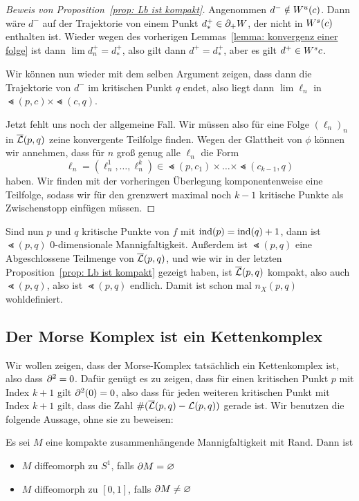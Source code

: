 \begin{proof}[Beweis von Proposition~\ref{prop: Lb ist kompakt}]
    Angenommen $d^- \notin { W^u } (c)$. Dann wäre $d^-$ auf der Trajektorie von einem Punkt
    $d^+_{\ast} \in { \partial }_+ W$, der nicht in ${ W^s } (c)$ enthalten ist. Wieder wegen des vorherigen
    Lemmas~\ref{lemma: konvergenz einer folge} ist dann $\lim d_n^+ = d^+_{\ast}$, also gilt dann
    $d^+ = d^+_{\ast}$, aber es gilt $d^+ \in { W^s }{c}$.
    
    Wir können nun wieder mit dem selben Argument zeigen, dass dann die Trajektorie von $d^-$ im
    kritischen Punkt $q$ endet, also liegt dann $\lim \ell_n$ in $\Lt (p, c) \times \Lt (c, q)$.

    Jetzt fehlt uns noch der allgemeine Fall. Wir müssen also für eine Folge $(\ell_n)_n$ in 
    ${\overline{\mathcal{L}} } (p, q)$ zeine konvergente Teilfolge finden. Wegen der Glattheit von $\phi$ können wir annehmen,
    dass für $n$ groß genug alle $\ell_n$ die Form 
    \[ \ell_n = (\ell^1_n, \dots, \ell^k_n) \in \Lt (p, c_1) \times \dots \times \Lt (c_{k - 1}, q) \]
    haben. Wir finden mit der vorheringen Überlegung komponentenweise eine Teilfolge, sodass wir 
    für den grenzwert maximal noch $k - 1$ kritische Punkte als \glqq Zwischenstopp\grqq{} einfügen
    müssen. 
\end{proof}

\begin{remark}
    Sind nun $p$ und $q$ kritische Punkte von $f$ mit ${ \operatorname{ind} } (p) = { \operatorname{ind} } (q) + 1$, dann ist 
    $\Lt(p, q)$ $0$-dimensionale Mannigfaltigkeit. Außerdem ist $\Lt (p, q)$ eine Abgeschlossene
    Teilmenge von ${\overline{\mathcal{L}} } (p, q)$, und wie wir in der letzten Proposition~\ref{prop: Lb ist kompakt}
    gezeigt haben, ist ${\overline{\mathcal{L}} }(p, q)$ kompakt, also auch $\Lt(p, q)$, also ist $\Lt (p, q)$ endlich.
    Damit ist schon mal $n_X (p, q)$ wohldefiniert.
\end{remark}

\subsection*{Der Morse Komplex ist ein Kettenkomplex}

Wir wollen zeigen, dass der Morse-Komplex tatsächlich ein Kettenkomplex ist, also dass ${ \partial }^2 = 0$.
Dafür genügt es zu zeigen, dass für einen kritischen Punkt $p$ mit Index $k + 1$ gilt ${ \partial }^2 (0) = 0$, 
also dass für jeden weiteren kritischen Punkt mit Index $k + 1$ gilt, dass die Zahl
$\# ({\overline{\mathcal{L}} } (p, q) - { \mathcal{L} } (p, q))$ gerade ist. Wir benutzen die folgende Aussage, ohne sie zu beweisen:

\begin{theorem}
    \label{satz: klassifizierung kompakter 1-mannigfaltigkeiten}
    Es sei $M$ eine kompakte zusammenhängende Mannigfaltigkeit mit Rand. Dann ist
    \begin{itemize}
        \item $M$ diffeomorph zu $S^1$, falls ${ \partial } M = \varnothing$
        \item $M$ diffeomorph zu $[0, 1]$, falls ${ \partial } M \neq \varnothing$
    \end{itemize}
\end{theorem}

